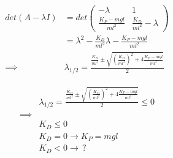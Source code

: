\documentclass[a4paper,parskip,headheight=38pt]{scrartcl} %
\begin{document}
\begin{align*}
det(A - \lambda I) &=  det\left( \begin{array}{cc} -\lambda & 1 \\ \frac{K_P-mgl}{ml^2} & \frac{K_D}{ml^2} - \lambda \end{array} \right) \\
 &= \lambda ^ 2 - \frac{K_D}{ml^2}\lambda - \frac{K_P - mgl}{ml^2} \\
\implies & \lambda_{1/2} = \frac{\frac{K_D}{ml^2} \pm \sqrt{\left(\frac{K_D}{ml^2}\right)^2 + 4\frac{K_P - mgl}{ml^2}}}{2}
\end{align*}

\begin{align*}
& \lambda_{1/2} = \frac{\frac{K_D}{ml^2} \pm \sqrt{\left(\frac{K_D}{ml^2}\right)^2 + 4\frac{K_P - mgl}{ml^2}}}{2} \leq 0 \\
\implies & \\
& K_D \leq 0  \\
& K_D = 0 \rightarrow K_P = mgl \\
& K_D < 0 \rightarrow \, ?
\end{align*}
\end{document}
